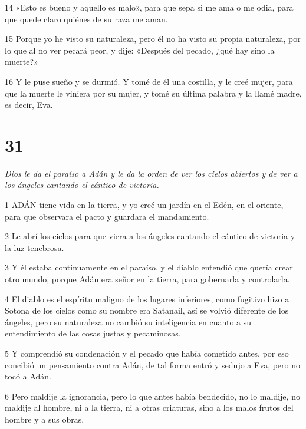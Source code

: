 \par 14 «Esto es bueno y aquello es malo», para que sepa si me ama o me odia, para que quede claro quiénes de su raza me aman.

\par 15 Porque yo he visto su naturaleza, pero él no ha visto su propia naturaleza, por lo que al no ver pecará peor, y dije: «Después del pecado, ¿qué hay sino la muerte?»

\par 16 Y le puse sueño y se durmió. Y tomé de él una costilla, y le creé mujer, para que la muerte le viniera por su mujer, y tomé su última palabra y la llamé madre, es decir, Eva.

\chapter{31}

\par \textit{Dios le da el paraíso a Adán y le da la orden de ver los cielos abiertos y de ver a los ángeles cantando el cántico de victoria.}

\par 1 ADÁN tiene vida en la tierra, y yo creé un jardín en el Edén, en el oriente, para que observara el pacto y guardara el mandamiento.

\par 2 Le abrí los cielos para que viera a los ángeles cantando el cántico de victoria y la luz tenebrosa.

\par 3 Y él estaba continuamente en el paraíso, y el diablo entendió que quería crear otro mundo, porque Adán era señor en la tierra, para gobernarla y controlarla.

\par 4 El diablo es el espíritu maligno de los lugares inferiores, como fugitivo hizo a Sotona de los cielos como su nombre era Satanail, así se volvió diferente de los ángeles, pero su naturaleza no cambió su inteligencia en cuanto a su entendimiento de las cosas justas y pecaminosas.

\par 5 Y comprendió su condenación y el pecado que había cometido antes, por eso concibió un pensamiento contra Adán, de tal forma entró y sedujo a Eva, pero no tocó a Adán.

\par 6 Pero maldije la ignorancia, pero lo que antes había bendecido, no lo maldije, no maldije al hombre, ni a la tierra, ni a otras criaturas, sino a los malos frutos del hombre y a sus obras.

